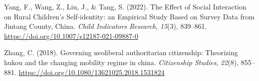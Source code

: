 \documentclass[
  man,floatsintext]{apa7}
\newlength{\cslhangindent}
\newlength{\cslentryspacingunit} %
\newenvironment{CSLReferences}[2] %
 {%
  \setlength{\parindent}{0pt}
  \ifodd #1
  \let\oldpar\par
  \def\par{\hangindent=\cslhangindent\oldpar}
  \fi
  \setlength{\parskip}{#2\cslentryspacingunit}
 }%
 {}
\begin{document}
\begin{CSLReferences}{1}{0}
\leavevmode{}%
Yang, F., Wang, Z., Liu, J., \& Tang, S. (2022). The Effect of Social Interaction on Rural Children{'}s Self-identity: an Empirical Study Based on Survey Data from Jintang County, China. \emph{Child Indicators Research}, \emph{15}(3), 839--861. \url{https://doi.org/10.1007/s12187-021-09887-0}

\leavevmode{}%
Zhang, C. (2018). Governing neoliberal authoritarian citizenship: Theorizing hukou and the changing mobility regime in china. \emph{Citizenship Studies}, \emph{22}(8), 855--881. \url{https://doi.org/10.1080/13621025.2018.1531824}

\end{CSLReferences}
\end{document}
